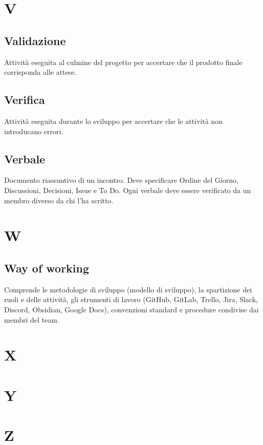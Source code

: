 \documentclass[a4paper,12pt]{article}
\begin{document}
\section{V}

\subsection*{Validazione}
Attività eseguita al culmine del progetto per accertare che il prodotto finale corrisponda alle attese.

\subsection*{Verifica}
Attività eseguita durante lo sviluppo per accertare che le attività non introducano errori.

\subsection*{Verbale}
Documento riassuntivo di un incontro. Deve specificare Ordine del Giorno, Discussioni, Decisioni, Issue e To Do.  
Ogni verbale deve essere verificato da un membro diverso da chi l’ha scritto.

\clearpage

\section{W}

\subsection*{Way of working}
Comprende le metodologie di sviluppo (modello di sviluppo), la spartizione dei ruoli e delle attività, gli strumenti di lavoro (GitHub, GitLab, Trello, Jira, Slack, Discord, Obsidian, Google Docs), convenzioni standard e procedure condivise dai membri del team.

\clearpage

\section{X}

\section{Y}

\section{Z}
\end{document}
